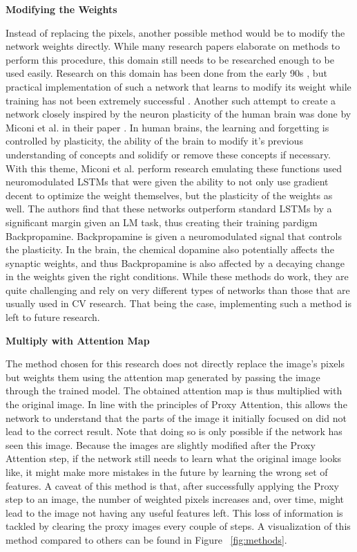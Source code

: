 \textbf{Modifying the Weights}

Instead of replacing the pixels, another possible method would be to modify the network weights directly. While many research papers elaborate on methods to perform this procedure, this domain still needs to be researched enough to be used easily. Research on this domain has been done from the early 90s \cite{schmidhuberSelfReferentialWeightMatrix1993}, but practical implementation of such a network that learns to modify its weight while training has not been extremely successful \cite{irieModernSelfReferentialWeight2022}. 
Another such attempt to create a network closely inspired by the neuron plasticity of the human brain was done by Miconi et al. in their paper \cite{miconiBackpropamineTrainingSelfmodifying2020}. In human brains, the learning and forgetting is controlled by plasticity, the ability of the brain to modify it's previous understanding of concepts and solidify or remove these concepts if necessary. With this theme, Miconi et al. perform research emulating these functions used neuromodulated LSTMs that were given the ability to not only use gradient decent to optimize the weight themselves, but the plasticity of the weights as well. The authors find that these networks outperform standard LSTMs by a significant margin given an LM task, thus creating their training pardigm Backpropamine. Backpropamine is given a neuromodulated signal that controls the plasticity. In the brain, the chemical dopamine also potentially affects the synaptic weights, and thus Backpropamine is also affected by a decaying change in the weights given the right conditions.
While these methods do work, they are quite challenging and rely on very different types of networks than those that are usually used in CV research. That being the case, implementing such a method is left to future research.

\textbf{Multiply with Attention Map}

The method chosen for this research does not directly replace the image's pixels but weights them using the attention map generated by passing the image through the trained model.
The obtained attention map is thus multiplied with the original image. In line with the principles of Proxy Attention, this allows the network to understand that the parts of the image it initially focused on did not lead to the correct result. Note that doing so is only possible if the network has seen this image. Because the images are slightly modified after the Proxy Attention step, if the network still needs to learn what the original image looks like, it might make more mistakes in the future by learning the wrong set of features.
A caveat of this method is that, after successfully applying the Proxy step to an image, the number of weighted pixels increases and, over time, might lead to the image not having any useful features left. This loss of information is tackled by clearing the proxy images every couple of steps.
A visualization of this method compared to others can be found in Figure ~\ref{fig:methods}.

